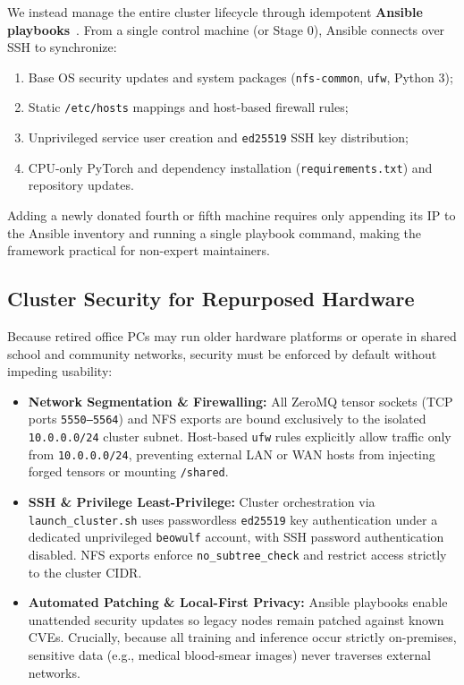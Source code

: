 \documentclass[conference]{IEEEtran}
\begin{document}
We instead manage the entire cluster lifecycle through idempotent \textbf{Ansible playbooks}~\cite{ansible}. From a single control machine (or Stage 0), Ansible connects over SSH to synchronize:
\begin{enumerate}
    \item Base OS security updates and system packages (\texttt{nfs-common}, \texttt{ufw}, Python 3);
    \item Static \texttt{/etc/hosts} mappings and host-based firewall rules;
    \item Unprivileged service user creation and \texttt{ed25519} SSH key distribution;
    \item CPU-only PyTorch and dependency installation (\texttt{requirements.txt}) and repository updates.
\end{enumerate}
Adding a newly donated fourth or fifth machine requires only appending its IP to the Ansible inventory and running a single playbook command, making the framework practical for non-expert maintainers.

\subsection{Cluster Security for Repurposed Hardware}
Because retired office PCs may run older hardware platforms or operate in shared school and community networks, security must be enforced by default without impeding usability:
\begin{itemize}
    \item \textbf{Network Segmentation \& Firewalling:} All ZeroMQ tensor sockets (TCP ports \texttt{5550--5564}) and NFS exports are bound exclusively to the isolated \texttt{10.0.0.0/24} cluster subnet. Host-based \texttt{ufw} rules explicitly allow traffic only from \texttt{10.0.0.0/24}, preventing external LAN or WAN hosts from injecting forged tensors or mounting \texttt{/shared}.
    \item \textbf{SSH & Privilege Least-Privilege:} Cluster orchestration via \texttt{launch\_cluster.sh} uses passwordless \texttt{ed25519} key authentication under a dedicated unprivileged \texttt{beowulf} account, with SSH password authentication disabled. NFS exports enforce \texttt{no\_subtree\_check} and restrict access strictly to the cluster CIDR.
    \item \textbf{Automated Patching & Local-First Privacy:} Ansible playbooks enable unattended security updates so legacy nodes remain patched against known CVEs. Crucially, because all training and inference occur strictly on-premises, sensitive data (e.g., medical blood-smear images) never traverses external networks.
\end{itemize}
\end{document}
